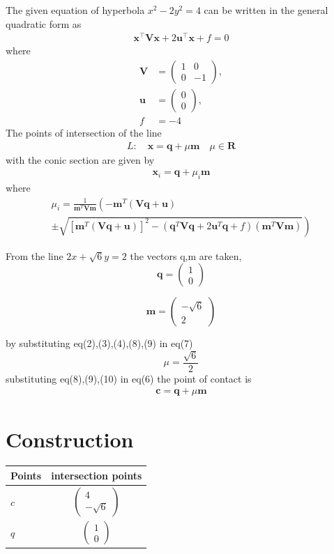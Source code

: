 \documentclass[journal,10pt,twocolumn]{article}
\let\vec\mathbf
\newcommand{\myvec}[1]{\ensuremath{\begin{pmatrix}#1\end{pmatrix}}}
\providecommand{\brak}[1]{\ensuremath{\left(#1\right)}}
\providecommand{\lbrak}[1]{\ensuremath{\left(#1\right.}}
\providecommand{\rbrak}[1]{\ensuremath{\left.#1\right)}}
\providecommand{\sbrak}[1]{\ensuremath{{}\left[#1\right]}}
\begin{document}
The given equation of hyperbola $x^2-2y^2=4$ can be written in the general quadratic form as
\begin{align}
    \label{eq:conic_quad_form}
    \vec{x}^{\top}\vec{V}\vec{x}+2\vec{u}^{\top}\vec{x}+f=0
    \end{align}
where
\begin{align}
  \label{eq:V_matrix}
  \vec{V} &= \myvec{1 & 0\\0 & -1},
  \\
  \label{eq:u_vector}
  \vec{u} &= \myvec{0\\0},
  \\
  \label{eq:f_value}
  f &= -4
\end{align}
The points of intersection of the line 
\begin{align}
  L: \quad \vec{x} = \vec{q} + \mu \vec{m} \quad \mu \in \mathbf{R}
\label{eq:conic_tangent}
\end{align}
with the conic section are given by
\begin{align}
\vec{x}_i = \vec{q} + \mu_i \vec{m}
\label{eq:conic_tangent_pts}
\end{align}
%
where
{\tiny
\begin{multline}
\mu_i = \frac{1}
{
\vec{m}^T\vec{V}\vec{m}
}
\lbrak{-\vec{m}^T\brak{\vec{V}\vec{q}+\vec{u}}}
\\
\pm
\rbrak{\sqrt{
\sbrak{
\vec{m}^T\brak{\vec{V}\vec{q}+\vec{u}}
}^2
-
\brak
{
\vec{q}^T\vec{V}\vec{q} + 2\vec{u}^T\vec{q} +f
}
\brak{\vec{m}^T\vec{V}\vec{m}}
}
}
\label{eq:tangent_roots}
\end{multline}
}



From the line $2x+\sqrt{6}y=2$ the vectors q,m are taken,
\begin{equation}
\vec{q}=\myvec{1\\0}
\end{equation}

\begin{equation}
\vec{m}=\myvec{-\sqrt{6}\\2}
\end{equation}

by substituting eq(2),(3),(4),(8),(9) in eq(7)
\begin{equation}
\mu = \frac{\sqrt{6}}{{2}}
\end{equation}
substituting eq(8),(9),(10) in eq(6) the point of contact is
\label{eq:conic_tangent_pts}
\begin{align}
\vec{c}= \vec{q}+ \mu \vec{m}
\label{eq:conic_tangent_pts}
\end{align}
\section*{\large Construction}

{
\setlength\extrarowheight{5pt}
\begin{tabular}{|l|c|}
    \hline 
    \textbf{Points} & \textbf{intersection points} \\ \hline
  $c$ & $\myvec{
   4\\
   -\sqrt{6}
   } $ \\\hline
  $q$ & $\myvec{
   1\\
   0
   } $ \\\hline
      \end{tabular}
}
\end{document}

